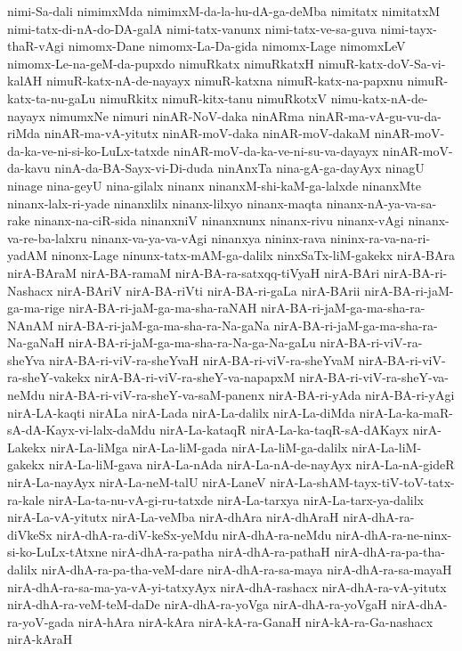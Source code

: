 {nimi-Sa-dali
nimimxMda
nimimxM-da-la-hu-dA-ga-deMba
nimitatx
nimitatxM
nimi-tatx-di-nA-do-DA-galA
nimi-tatx-vanunx
nimi-tatx-ve-sa-guva
nimi-tayx-thaR-vAgi
nimomx-Dane
nimomx-La-Da-gida
nimomx-Lage
nimomxLeV
nimomx-Le-na-geM-da-pupxdo
nimuRkatx
nimuRkatxH
nimuR-katx-doV-Sa-vi-kalAH
nimuR-katx-nA-de-nayayx
nimuR-katxna
nimuR-katx-na-papxnu
nimuR-katx-ta-nu-gaLu
nimuRkitx
nimuR-kitx-tanu
nimuRkotxV
nimu-katx-nA-de-nayayx
nimumxNe
nimuri
ninAR-NoV-daka
ninARma
ninAR-ma-vA-gu-vu-da-riMda
ninAR-ma-vA-yitutx
ninAR-moV-daka
ninAR-moV-dakaM
ninAR-moV-da-ka-ve-ni-si-ko-LuLx-tatxde
ninAR-moV-da-ka-ve-ni-su-va-dayayx
ninAR-moV-da-kavu
ninA-da-BA-Sayx-vi-Di-duda
ninAnxTa
nina-gA-ga-dayAyx
ninagU
ninage
nina-geyU
nina-gilalx
ninanx
ninanxM-shi-kaM-ga-lalxde
ninanxMte
ninanx-lalx-ri-yade
ninanxlilx
ninanx-lilxyo
ninanx-maqta
ninanx-nA-ya-va-sa-rake
ninanx-na-ciR-sida
ninanxniV
ninanxnunx
ninanx-rivu
ninanx-vAgi
ninanx-va-re-ba-lalxru
ninanx-va-ya-va-vAgi
ninanxya
nininx-rava
nininx-ra-va-na-ri-yadAM
ninonx-Lage
ninunx-tatx-mAM-ga-dalilx
ninxSaTx-liM-gakekx
nirA-BAra
nirA-BAraM
nirA-BA-ramaM
nirA-BA-ra-satxqq-tiVyaH
nirA-BAri
nirA-BA-ri-Nashacx
nirA-BAriV
nirA-BA-riVti
nirA-BA-ri-gaLa
nirA-BArii
nirA-BA-ri-jaM-ga-ma-rige
nirA-BA-ri-jaM-ga-ma-sha-raNAH
nirA-BA-ri-jaM-ga-ma-sha-ra-NAnAM
nirA-BA-ri-jaM-ga-ma-sha-ra-Na-gaNa
nirA-BA-ri-jaM-ga-ma-sha-ra-Na-gaNaH
nirA-BA-ri-jaM-ga-ma-sha-ra-Na-ga-Na-gaLu
nirA-BA-ri-viV-ra-sheYva
nirA-BA-ri-viV-ra-sheYvaH
nirA-BA-ri-viV-ra-sheYvaM
nirA-BA-ri-viV-ra-sheY-vakekx
nirA-BA-ri-viV-ra-sheY-va-napapxM
nirA-BA-ri-viV-ra-sheY-va-neMdu
nirA-BA-ri-viV-ra-sheY-va-saM-panenx
nirA-BA-ri-yAda
nirA-BA-ri-yAgi
nirA-LA-kaqti
nirALa
nirA-Lada
nirA-La-dalilx
nirA-La-diMda
nirA-La-ka-maR-sA-dA-Kayx-vi-lalx-daMdu
nirA-La-kataqR
nirA-La-ka-taqR-sA-dAKayx
nirA-Lakekx
nirA-La-liMga
nirA-La-liM-gada
nirA-La-liM-ga-dalilx
nirA-La-liM-gakekx
nirA-La-liM-gava
nirA-La-nAda
nirA-La-nA-de-nayAyx
nirA-La-nA-gideR
nirA-La-nayAyx
nirA-La-neM-talU
nirA-LaneV
nirA-La-shAM-tayx-tiV-toV-tatx-ra-kale
nirA-La-ta-nu-vA-gi-ru-tatxde
nirA-La-tarxya
nirA-La-tarx-ya-dalilx
nirA-La-vA-yitutx
nirA-La-veMba
nirA-dhAra
nirA-dhAraH
nirA-dhA-ra-diVkeSx
nirA-dhA-ra-diV-keSx-yeMdu
nirA-dhA-ra-neMdu
nirA-dhA-ra-ne-ninx-si-ko-LuLx-tAtxne
nirA-dhA-ra-patha
nirA-dhA-ra-pathaH
nirA-dhA-ra-pa-tha-dalilx
nirA-dhA-ra-pa-tha-veM-dare
nirA-dhA-ra-sa-maya
nirA-dhA-ra-sa-mayaH
nirA-dhA-ra-sa-ma-ya-vA-yi-tatxyAyx
nirA-dhA-rashacx
nirA-dhA-ra-vA-yitutx
nirA-dhA-ra-veM-teM-daDe
nirA-dhA-ra-yoVga
nirA-dhA-ra-yoVgaH
nirA-dhA-ra-yoV-gada
nirA-hAra
nirA-kAra
nirA-kA-ra-GanaH
nirA-kA-ra-Ga-nashacx
nirA-kAraH
}
